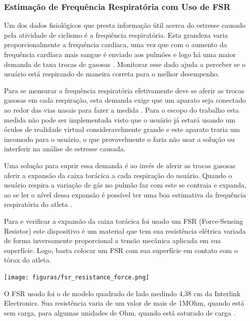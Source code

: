 \subsubsection{Estimação de Frequência Respiratória com Uso de FSR}

	Um dos dados fisiológicos que presta informação útil acerca do estresse causado pela atividade de ciclismo é a frequência respiratória. Esta grandeza varia proporcionalmente a frequência cardíaca, uma vez que com o aumento da frequência cardíaca mais sangue é enviado aos pulmões e logo há uma maior demanda de taxa trocas de gasosas \cite{rosero}.  Monitorar esse dado ajuda a perceber se o usuário está respirando de maneira correta para o melhor desempenho.

	Para se mensurar a frequência respiratória efetivamente deve se aferir as trocas gasosas em cada respiração, esta demanda exige que um aparato seja conectado ao redor das vias nasais para fazer a medida \cite{miranda2015}. Para o escopo do trabalho esta medida não pode ser implementada visto que o usuário já estará usando um óculos de realidade virtual consideravelmente grande e este aparato traria um incomodo para o usuário, o que provavelmente o faria não usar a solução ou interferir na análise de estresse causada.

	Uma solução para suprir essa demanda é ao invés de aferir as trocas gasosas aferir a expansão da caixa torácica a cada respiração do usuário. Quando o usuário respira a variação de gás no pulmão faz com este se contraia e expanda, ao se ler o nível dessa expansão é possível ter uma boa estimativa da frequência respiratória do atleta \cite{miranda2015}.

	Para e verificar a expansão da caixa torácica foi usado um FSR (Force-Sensing Resistor) este dispositivo é um material que tem sua resistência elétrica variada de forma inversamente proporcional a tensão mecânica aplicada em sua superfície. Logo, basta colocar um FSR com sua superfície em contato com o tórax do atleta.

    \begin{center}
    	\texttt{[image: figuras/fsr\_resistance\_force.png]}
        \label{fsr_curve}
    \end{center}

	O FSR usado foi o de modelo quadrado de lado medindo 4,38 cm da Interlink Electronics. Sua resistência varia de um valor de mais de 1MOhm, quando está sem carga, para algumas unidades de Ohm, quando está saturado de carga \cite{fsr_guide}.

